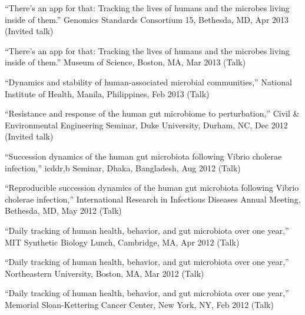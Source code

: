 \documentclass[overlapped,line,11pt]{res}
\begin{document}
\begin{resume}
\begin{revnumerate}[28]
\item {``There's an app for that: Tracking the lives of humans and the
  microbes living inside of them.'' Genomics Standards Consortium 15,
  Bethesda, MD, Apr 2013 (Invited talk)}
\vspace*{0mm}

\item {``There's an app for that: Tracking the lives of humans and
  the microbes living inside of them.'' Museum of Science, Boston,
  MA, Mar 2013 (Talk)}
\vspace*{0mm}

\item {``Dynamics and stability of human-associated microbial
  communities,'' National Institute of Health, Manila,
  Philippines, Feb 2013 (Talk)}
\vspace*{0mm}

\item {``Resistance and response of the human gut microbiome to
  perturbation,'' Civil \& Environmental Engineering Seminar, Duke University,
  Durham, NC, Dec 2012 (Invited talk)}\vspace*{0mm}

\item {``Succession dynamics of the human gut microbiota
  following Vibrio cholerae infection,'' icddr,b Seminar, Dhaka,
  Bangladesh, Aug 2012 (Talk)}
\vspace*{0mm}

\item {``Reproducible succession dynamics of the human gut microbiota
  following Vibrio cholerae infection,'' International Research in
  Infectious Diseases Annual Meeting, Bethesda, MD, May 2012 (Talk)}
\vspace*{0mm}

\item {``Daily tracking of human health, behavior, and gut microbiota
  over one year,'' MIT Synthetic Biology Lunch, Cambridge, MA, Apr 2012 (Talk)}
\vspace*{0mm}

\item {``Daily tracking of human health, behavior, and gut microbiota
  over one year,'' Northeastern University, Boston, MA, Mar 2012 (Talk)}
\vspace*{0mm}

\item {``Daily tracking of human health, behavior, and gut microbiota
  over one year,'' Memorial Sloan-Kettering Cancer Center, New York, NY,
  Feb 2012 (Talk)}
\vspace*{0mm}


\end{revnumerate}
\end{resume}
\end{document}
